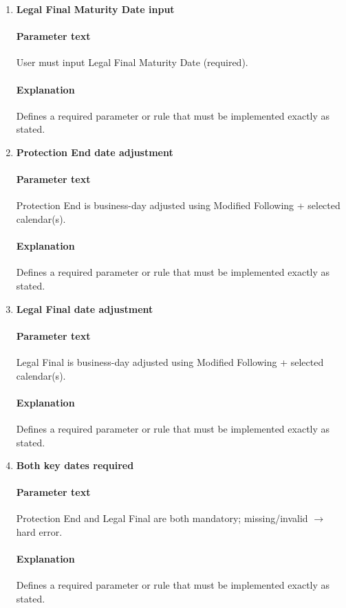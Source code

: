 \documentclass[11pt]{article}
\begin{document}
\begin{enumerate}[label=\arabic*),leftmargin=*,align=left]
\item \textbf{Legal Final Maturity Date input}
\paragraph{Parameter text} User must input Legal Final Maturity Date (required).
\paragraph{Explanation} Defines a required parameter or rule that must be implemented exactly as stated.

\item \textbf{Protection End date adjustment}
\paragraph{Parameter text} Protection End is business-day adjusted using Modified Following + selected calendar(s).
\paragraph{Explanation} Defines a required parameter or rule that must be implemented exactly as stated.

\item \textbf{Legal Final date adjustment}
\paragraph{Parameter text} Legal Final is business-day adjusted using Modified Following + selected calendar(s).
\paragraph{Explanation} Defines a required parameter or rule that must be implemented exactly as stated.

\item \textbf{Both key dates required}
\paragraph{Parameter text} Protection End and Legal Final are both mandatory; missing/invalid $\rightarrow$ hard error.
\paragraph{Explanation} Defines a required parameter or rule that must be implemented exactly as stated.


\end{enumerate}
\end{document}
